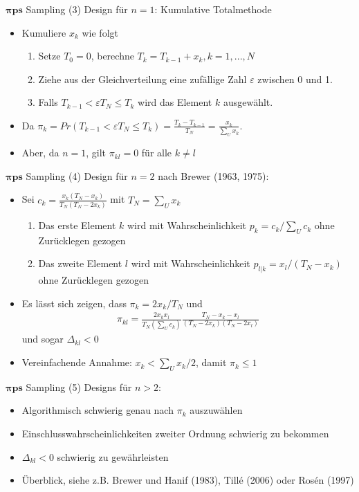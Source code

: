 \documentclass[9pt]{beamer}
\begin{document}
\begin{frame}{$\boldsymbol{\pi ps}$ Sampling (3)}
Design für $n=1$: Kumulative Totalmethode
\begin{itemize}
	\item Kumuliere $x_k$ wie folgt
\begin{enumerate}
	\item Setze $T_0 =0$, berechne $T_k = T_{k-1}+ x_k, k=1,...,N$
	\item Ziehe aus der Gleichverteilung eine zufällige Zahl $\varepsilon$ zwischen 0 und 1. 
	\item Falls $T_{k-1} < \varepsilon T_N \leq T_k$ wird das Element $k$ ausgewählt.
\end{enumerate}
\item Da $\pi_k = Pr(T_{k-1}<\varepsilon T_N \leq T_k) = \frac{T_k -T_{k-1}}{T_N} = \frac{x_k}{\sum_U x_k}$.
\item Aber, da $n=1$, gilt $\pi_{kl}=0$ für alle $k\neq l$
\end{itemize}

\end{frame}


\begin{frame}{$\boldsymbol{\pi ps}$ Sampling (4)}
Design für $n=2$ nach Brewer (1963, 1975):
\begin{itemize}
	\item Sei $c_k = \frac{x_k(T_N-x_k)}{T_N(T_N-2x_k)}$ mit $T_N = \sum_U x_k$
	\begin{enumerate}
		\item Das erste Element $k$ wird mit Wahrscheinlichkeit $p_k =c_k/\sum_U c_k$ ohne Zurücklegen gezogen
		\item Das zweite Element $l$ wird mit Wahrscheinlichkeit $p_{l|k} = x_l/(T_N-x_k)$ ohne Zurücklegen gezogen
	\end{enumerate}
	\item Es lässt sich zeigen, dass $\pi_k = 2x_k/T_N$ und 
	\begin{align*}
	\pi_{kl} = \frac{2x_k x_l}{T_N (\sum_U c_k)}\frac{T_N - x_k - x_l}{(T_N-2x_k)(T_N-2x_l)}
	\end{align*}
	und sogar $\Delta_{kl}<0$
	\item Vereinfachende Annahme: $x_k < \sum_U x_k/2$, damit $\pi_k \leq 1$
\end{itemize}
\end{frame}


\begin{frame}{$\boldsymbol{\pi ps}$ Sampling (5)}
Designs für $n>2$:
\begin{itemize}
	\item Algorithmisch schwierig genau nach $\pi_k$ auszuwählen
	\item Einschlusswahrscheinlichkeiten zweiter Ordnung schwierig zu bekommen
	\item $\Delta_{kl}<0$ schwierig zu gewährleisten
	\item Überblick, siehe z.B. Brewer und Hanif (1983), Tillé (2006) oder Rosén (1997) 
\end{itemize}
\end{frame}
\end{document}
